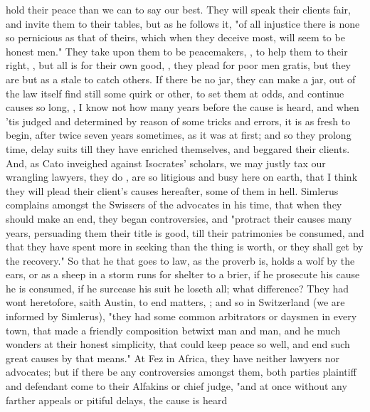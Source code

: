 hold their peace than we can to say our best. They will speak their clients
fair, and invite them to their tables, but as he follows it,
"of all injustice there is none so pernicious as that of
theirs, which when they deceive most, will seem to be honest men." They take
upon them to be peacemakers, , to help them to
their right, , but all is for
their own good, , they plead for poor men
gratis, but they are but as a stale to catch others. If there be no jar,
they can make a jar, out of the law itself find still some
quirk or other, to set them at odds, and continue causes so long, , I know not how many years before the cause is heard, and when 'tis
judged and determined by reason of some tricks and errors, it is as fresh to
begin, after twice seven years sometimes, as it was at first; and so they
prolong time, delay suits till they have enriched themselves, and beggared
their clients. And, as Cato inveighed against Isocrates'
scholars, we may justly tax our wrangling lawyers, they do , are so litigious and busy here on earth, that I think they will plead
their client's causes hereafter, some of them in hell.
Simlerus complains amongst the Swissers of the advocates in
his time, that when they should make an end, they began controversies, and
"protract their causes many years, persuading them their title is good, till
their patrimonies be consumed, and that they have spent more in seeking than
the thing is worth, or they shall get by the recovery." So that he that goes to
law, as the proverb is, holds a wolf by the ears, or as a
sheep in a storm runs for shelter to a brier, if he prosecute his cause he is
consumed, if he surcease his suit he loseth all; what
difference? They had wont heretofore, saith Austin, to end matters, ; and so in Switzerland (we are informed by
Simlerus), "they had some common arbitrators or daysmen in
every town, that made a friendly composition betwixt man and man, and he much
wonders at their honest simplicity, that could keep peace so well, and end such
great causes by that means." At Fez in Africa, they have
neither lawyers nor advocates; but if there be any controversies amongst them,
both parties plaintiff and defendant come to their Alfakins or chief judge,
"and at once without any farther appeals or pitiful delays, the cause is heard
